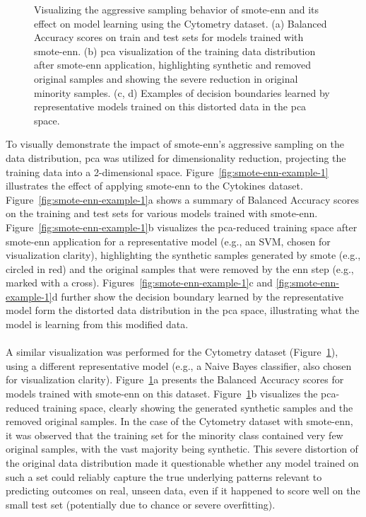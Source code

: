 \documentclass[12pt,a4paper]{report}
\begin{document}
\begin{figure}[h!]
    
    \caption[Visualizing \gls{smote}-\gls{enn} on Cytometry]{Visualizing the aggressive sampling behavior of \gls{smote}-\gls{enn} and its effect on model learning using the Cytometry dataset. (a) Balanced Accuracy scores on train and test sets for models trained with \gls{smote}-\gls{enn}. (b) \gls{pca} visualization of the training data distribution after \gls{smote}-\gls{enn} application, highlighting synthetic and removed original samples and showing the severe reduction in original minority samples. (c, d) Examples of decision boundaries learned by representative models trained on this distorted data in the \gls{pca} space.}

    \label{fig:smote-enn-example-2}
\end{figure}

\noindent
To visually demonstrate the impact of \gls{smote}-\gls{enn}'s aggressive sampling on the data distribution, \acrfull{pca} was utilized for dimensionality reduction, projecting the training data into a 2-dimensional space. Figure~\ref{fig:smote-enn-example-1} illustrates the effect of applying \gls{smote}-\gls{enn} to the Cytokines dataset. Figure~\ref{fig:smote-enn-example-1}a shows a summary of Balanced Accuracy scores on the training and test sets for various models trained with \gls{smote}-\gls{enn}. Figure~\ref{fig:smote-enn-example-1}b visualizes the \gls{pca}-reduced training space after \gls{smote}-\gls{enn} application for a representative model (e.g., an SVM, chosen for visualization clarity), highlighting the synthetic samples generated by \gls{smote} (e.g., circled in red) and the original samples that were removed by the \gls{enn} step (e.g., marked with a cross). Figures~\ref{fig:smote-enn-example-1}c and \ref{fig:smote-enn-example-1}d further show the decision boundary learned by the representative model form the distorted data distribution in the \gls{pca} space, illustrating what the model is learning from this modified data.\\
\\
A similar visualization was performed for the Cytometry dataset (Figure~\ref{fig:smote-enn-example-2}), using a different representative model (e.g., a Naive Bayes classifier, also chosen for visualization clarity). Figure~\ref{fig:smote-enn-example-2}a presents the Balanced Accuracy scores for models trained with \gls{smote}-\gls{enn} on this dataset. Figure~\ref{fig:smote-enn-example-2}b visualizes the \gls{pca}-reduced training space, clearly showing the generated synthetic samples and the removed original samples. In the case of the Cytometry dataset with \gls{smote}-\gls{enn}, it was observed that the training set for the minority class contained very few original samples, with the vast majority being synthetic. This severe distortion of the original data distribution made it questionable whether any model trained on such a set could reliably capture the true underlying patterns relevant to predicting outcomes on real, unseen data, even if it happened to score well on the small test set (potentially due to chance or severe overfitting).\\
\end{document}

